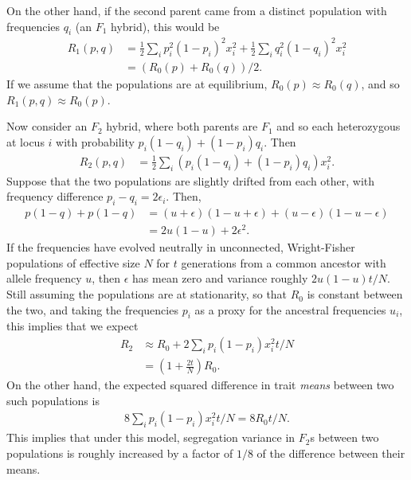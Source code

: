 \documentclass{article}
\newcommand{\1}{\mathbbm{1}}
\begin{document}
On the other hand,
if the second parent came from a distinct population
with frequencies $q_i$
(an $F_1$ hybrid),
this would be
\begin{align*}
    R_1(p,q) &= \frac{1}{2} \sum_i p_i^2 (1-p_i)^2 x_i^2 
                + \frac{1}{2} \sum_i q_i^2 (1-q_i)^2 x_i^2 \\
                &= (R_0(p) + R_0(q))/2 .
\end{align*}
If we assume that the populations are at equilibrium, $R_0(p) \approx R_0(q)$,
and so $R_1(p,q) \approx R_0(p)$.

Now consider an $F_2$ hybrid, where both parents are $F_1$
and so each heterozygous at locus $i$ with probability $p_i (1-q_i) + (1-p_i) q_i$.
Then
\begin{align*}
    R_2(p,q) &= \frac{1}{2} \sum_i \left(p_i (1-q_i) + (1-p_i) q_i \right) x_i^2  .
\end{align*}
Suppose that the two populations are slightly drifted from each other,
with frequency difference $p_i-q_i = 2\epsilon_i$.
Then,
\begin{align*}
    p (1-q) + p (1-q)
    &=
    (u+\epsilon) (1-u+\epsilon) + (u-\epsilon) (1-u-\epsilon) \\
    &=
    2 u (1-u)
    + 2 \epsilon^2 .
\end{align*}
If the frequencies have evolved neutrally in unconnected, Wright-Fisher populations 
of effective size $N$ for $t$ generations from a common ancestor with allele frequency $u$,
then $\epsilon$ has mean zero and variance roughly $2 u (1-u) t/N$.
Still assuming the populations are at stationarity,
so that $R_0$ is constant between the two,
and taking the frequencies $p_i$ as a proxy for the ancestral frequencies $u_i$,
this implies that we expect
\begin{align*}
    R_2 
    &\approx 
    R_0 + 2 \sum_i p_i (1-p_i) x_i^2 t/N \\
    &=
    \left( 1 + \frac{2t}{N} \right) R_0 .
\end{align*}
On the other hand, the expected squared difference in trait \emph{means} between two such populations is
\begin{align} \label{eqn:var_dx}
    8 \sum_i p_i (1-p_i) x_i^2 t / N = 8 R_0 t /N .
\end{align}
This implies that under this model,
segregation variance in $F_2$s between two populations
is roughly increased by a factor of $1/8$ of the difference between their means.
\end{document}
